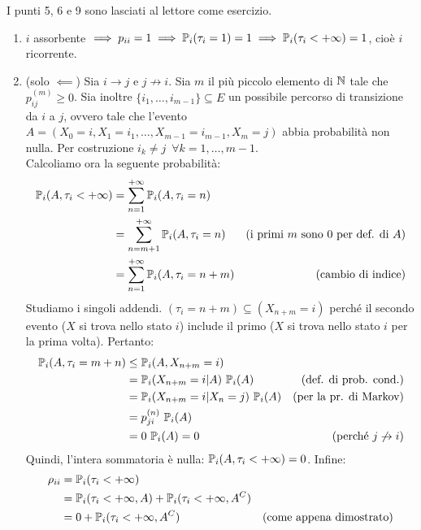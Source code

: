 \begin{dimo} I punti 5, 6 e 9 sono lasciati al lettore come esercizio.
	\begin{enumerate}
		\item $i$ assorbente $\implies p_{ii} = 1 \implies \mathbb P_i(\tau_i=1) = 1 \implies \mathbb P_i(\tau_i < +\infty) = 1$, cioè $i$ ricorrente.
		\item (solo $\impliedby$) Sia $i \to j$ e $j \not\to i$. Sia $m$ il più piccolo elemento di $\mathbb N$ tale che $p_{ij}^{(m)} \ge 0$.
		Sia inoltre $\{i_1,\dots,i_{m-1}\} \subseteq E$ un possibile percorso di transizione da $i$ a $j$, ovvero tale che l'evento
		$A = (X_0=i, X_1=i_1,\dots,X_{m-1}=i_{m-1},X_m=j)$ abbia probabilità non nulla.
		Per costruzione $i_k \neq j \enspace \forall k=1,\dots,m-1$. \\
		Calcoliamo ora la seguente probabilità:
		\begin{align*}
			\mathbb P_i(A, \tau_i < +\infty) &= \sum_{n=1}^{+\infty} \mathbb P_i(A,\tau_i=n) \\
			&= \sum_{n=m+1}^{+\infty} \mathbb P_i(A,\tau_i=n) &\text{(i primi $m$ sono 0 per def. di $A$)} \\
			&= \sum_{n=1}^{+\infty} \mathbb P_i(A,\tau_i=n+m) &\text{(cambio di indice)}
		\end{align*}
		Studiamo i singoli addendi. $(\tau_i=n+m) \subseteq (X_{n+m}=i)$ perché il secondo evento ($X$ si trova nello stato $i$) include il primo ($X$ si trova nello stato $i$ per la prima volta). Pertanto:
		\begin{align*}
			\mathbb P_i(A, \tau_i=m+n) &\le \mathbb P_i(A, X_{n+m}=i) \\
			&= \mathbb P_i(X_{n+m}=i | A) \ \mathbb P_i(A) &\text{(def. di prob. cond.)} \\
			&= \mathbb P_i(X_{n+m}=i | X_n=j) \ \mathbb P_i(A) &\text{(per la pr. di Markov)} \\
			&= p_{ji}^{(n)} \ \mathbb P_i(A) \\
			&= 0 \ \mathbb P_i(A) = 0 &\text{(perché $j \not\to i$)}
		\end{align*}
		Quindi, l'intera sommatoria è nulla: $\mathbb P_i(A, \tau_i < +\infty) = 0$. Infine:
		\begin{align*}
			\rho_{ii} &= \PP_i(\tau_i < +\infty) \\
			&=
			\PP_i(\tau_i < +\infty, A) + \PP_i(\tau_i < +\infty, A^C) \\
			&= 0 + \PP_i(\tau_i < +\infty, A^C) &\text{(come appena dimostrato)} \\

\end{align*}
\end{enumerate}
\end{dimo}

